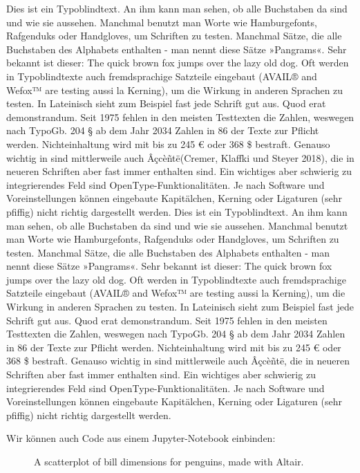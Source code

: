 \documentclass[
  letterpaper,
  DIV=11]{scrartcl}
\begin{document}
Dies ist ein Typoblindtext. An ihm kann man sehen, ob alle Buchstaben da
sind und wie sie aussehen. Manchmal benutzt man Worte wie Hamburgefonts,
Rafgenduks oder Handgloves, um Schriften zu testen. Manchmal Sätze, die
alle Buchstaben des Alphabets enthalten - man nennt diese Sätze
»Pangrams«. Sehr bekannt ist dieser: The quick brown fox jumps over the
lazy old dog. Oft werden in Typoblindtexte auch fremdsprachige Satzteile
eingebaut (AVAIL® and Wefox™ are testing aussi la Kerning), um die
Wirkung in anderen Sprachen zu testen. In Lateinisch sieht zum Beispiel
fast jede Schrift gut aus. Quod erat demonstrandum. Seit 1975 fehlen in
den meisten Testtexten die Zahlen, weswegen nach TypoGb. 204 § ab dem
Jahr 2034 Zahlen in 86 der Texte zur Pflicht werden. Nichteinhaltung
wird mit bis zu 245 € oder 368 \$ bestraft. Genauso wichtig in sind
mittlerweile auch Âçcèñtë(Cremer, Klaffki und Steyer 2018), die in
neueren Schriften aber fast immer enthalten sind. Ein wichtiges aber
schwierig zu integrierendes Feld sind OpenType-Funktionalitäten. Je nach
Software und Voreinstellungen können eingebaute Kapitälchen, Kerning
oder Ligaturen (sehr pfiffig) nicht richtig dargestellt werden. Dies ist
ein Typoblindtext. An ihm kann man sehen, ob alle Buchstaben da sind und
wie sie aussehen. Manchmal benutzt man Worte wie Hamburgefonts,
Rafgenduks oder Handgloves, um Schriften zu testen. Manchmal Sätze, die
alle Buchstaben des Alphabets enthalten - man nennt diese Sätze
»Pangrams«. Sehr bekannt ist dieser: The quick brown fox jumps over the
lazy old dog. Oft werden in Typoblindtexte auch fremdsprachige Satzteile
eingebaut (AVAIL® and Wefox™ are testing aussi la Kerning), um die
Wirkung in anderen Sprachen zu testen. In Lateinisch sieht zum Beispiel
fast jede Schrift gut aus. Quod erat demonstrandum. Seit 1975 fehlen in
den meisten Testtexten die Zahlen, weswegen nach TypoGb. 204 § ab dem
Jahr 2034 Zahlen in 86 der Texte zur Pflicht werden. Nichteinhaltung
wird mit bis zu 245 € oder 368 \$ bestraft. Genauso wichtig in sind
mittlerweile auch Âçcèñtë, die in neueren Schriften aber fast immer
enthalten sind. Ein wichtiges aber schwierig zu integrierendes Feld sind
OpenType-Funktionalitäten. Je nach Software und Voreinstellungen können
eingebaute Kapitälchen, Kerning oder Ligaturen (sehr pfiffig) nicht
richtig dargestellt werden.

Wir können auch Code aus einem Jupyter-Notebook einbinden:

\begin{figure}


\caption{\label{fig-bill-scatter}A scatterplot of bill dimensions for
penguins, made with Altair.}

\end{figure}%
\end{document}

